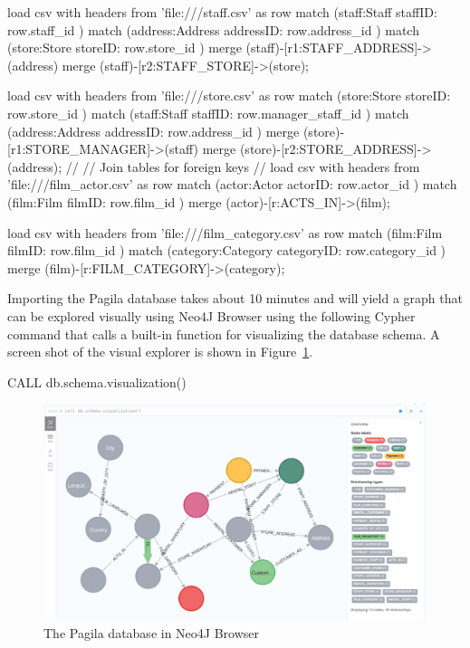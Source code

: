 \begin{cyphercode}
load csv with headers from 'file:///staff.csv' as row
match (staff:Staff {staffID: row.staff_id} )
match (address:Address {addressID: row.address_id} )
match (store:Store {storeID: row.store_id} )
merge (staff)-[r1:STAFF_ADDRESS]->(address)
merge (staff)-[r2:STAFF_STORE]->(store);

load csv with headers from 'file:///store.csv' as row
match (store:Store {storeID: row.store_id} )
match (staff:Staff {staffID: row.manager_staff_id} )
match (address:Address {addressID: row.address_id} )
merge (store)-[r1:STORE_MANAGER]->(staff)
merge (store)-[r2:STORE_ADDRESS]->(address);
//
// Join tables for foreign keys
//
load csv with headers from 'file:///film_actor.csv' as row
match (actor:Actor {actorID: row.actor_id} )
match (film:Film {filmID: row.film_id} )
merge (actor)-[r:ACTS_IN]->(film);

load csv with headers from 'file:///film_category.csv' as row
match (film:Film {filmID: row.film_id} )
match (category:Category {categoryID: row.category_id} )
merge (film)-[r:FILM_CATEGORY]->(category);
\end{cyphercode}

Importing the Pagila database takes about 10 minutes and will yield a graph that can be explored visually using Neo4J Browser using the following Cypher command that calls a built-in function for visualizing the database schema. A screen shot of the visual explorer is shown in Figure~\ref{fig:pagilagraph}.

\begin{cyphercode}
CALL db.schema.visualization()
\end{cyphercode}


\begin{figure}
\includegraphics[width=\textwidth]{screen13.png}
\caption{The Pagila database in Neo4J Browser}
\label{fig:pagilagraph}
\end{figure}

